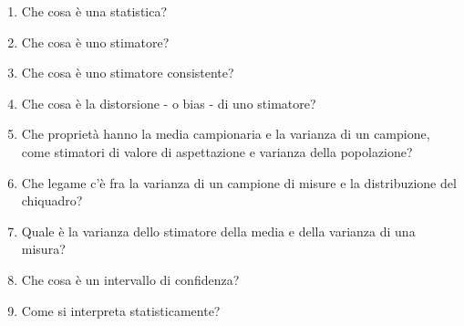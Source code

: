 \begin{enumerate}
	\item Che cosa \`{e} una statistica?
	\item Che cosa \`{e} uno stimatore?
	\item Che cosa \`{e} uno stimatore consistente?
	\item Che cosa \`{e} la distorsione - o bias - di uno stimatore?
	\item Che propriet\`{a} hanno la media campionaria e la varianza di un campione, come stimatori di valore di aspettazione e varianza della popolazione?
	\item Che legame c'\`{e} fra la varianza di un campione di misure e la distribuzione del chiquadro?
	\item Quale \`{e} la varianza dello stimatore della media e della varianza di una misura?
	\item Che cosa \`{e} un intervallo di confidenza?
	\item Come si interpreta statisticamente?

\end{enumerate}


